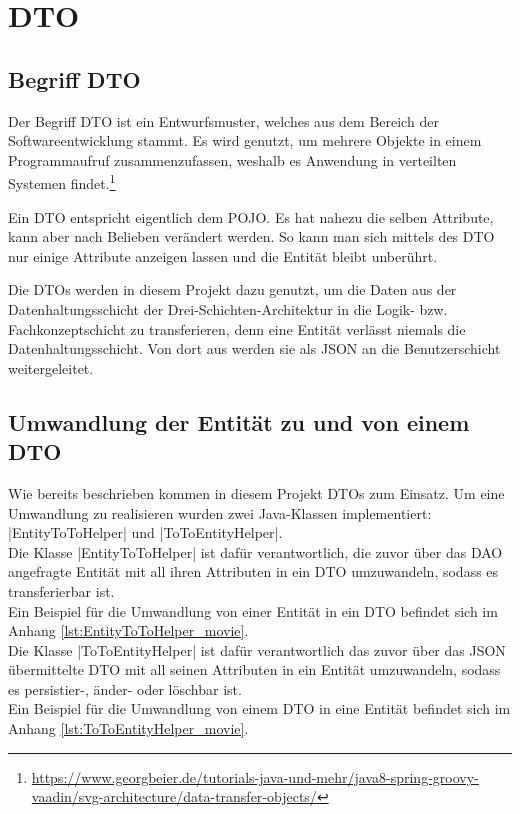\section{\acf{DTO}}
\label{sec:dto}

\subsection{Begriff \acf{DTO}}
\label{ssec:Was_ist_dto}

Der Begriff \ac{DTO} ist ein Entwurfsmuster, welches aus dem Bereich der Softwareentwicklung stammt.
Es wird genutzt, um mehrere Objekte in einem Programmaufruf zusammenzufassen, weshalb es Anwendung in verteilten Systemen findet.\footnote{\url{https://www.georgbeier.de/tutorials-java-und-mehr/java8-spring-groovy-vaadin/svg-architecture/data-transfer-objects/}}

Ein \ac{DTO} entspricht eigentlich dem \ac{POJO}.
Es hat nahezu die selben Attribute, kann aber nach Belieben verändert werden.
So kann man sich mittels des \ac{DTO} nur einige Attribute anzeigen lassen und die Entität bleibt unberührt.

Die \acsp{DTO} werden in diesem Projekt dazu genutzt, um die Daten aus der Datenhaltungsschicht der Drei-Schichten-Architektur in die Logik- bzw. Fachkonzeptschicht zu transferieren, denn eine Entität verlässt niemals die Datenhaltungsschicht.
Von dort aus werden sie als \acs{JSON} an die Benutzerschicht weitergeleitet.

\subsection{Umwandlung der Entität zu und von einem \acf{DTO}}
\label{ssec:umwandlung_dto}

Wie bereits beschrieben kommen in diesem Projekt \acp{DTO} zum Einsatz.
Um eine Umwandlung zu realisieren wurden zwei Java-Klassen implementiert: \jinline|EntityToToHelper| und \jinline|ToToEntityHelper|. \\

Die Klasse \jinline|EntityToToHelper| ist dafür verantwortlich, die zuvor über das \acs{DAO} angefragte Entität mit all ihren Attributen in ein \acs{DTO} umzuwandeln, sodass es transferierbar ist. \\
Ein Beispiel für die Umwandlung von einer Entität in ein \acs{DTO} befindet sich im Anhang \vref{lst:EntityToToHelper_movie}. \\

Die Klasse \jinline|ToToEntityHelper| ist dafür verantwortlich das zuvor über das \acs{JSON} übermittelte \acs{DTO} mit all seinen Attributen in ein Entität umzuwandeln, sodass es persistier-, änder- oder löschbar ist.\\
Ein Beispiel für die Umwandlung von einem \acs{DTO} in eine Entität befindet sich im Anhang \vref{lst:ToToEntityHelper_movie}.
